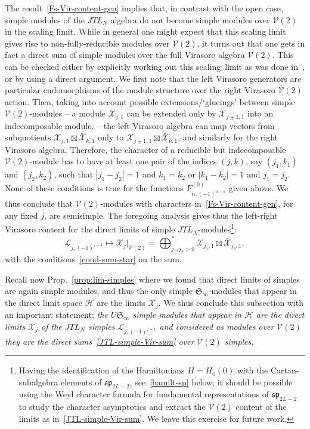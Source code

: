 \documentclass[11pt]{article}
\newcommand{\scal}{scaling~}
\newcommand{\q}{\mathfrak{q}}
\newcommand{\JTL}[1]{JTL_{#1}}
\newcommand{\LQGodd}{U^{\text{odd}}_{\q} s\ell(2)}
\newcommand{\Hilb}{\mathcal{H}}
\newcommand{\Vir}{\mathcal{V}}
\newcommand{\VirN}{\boldsymbol{\mathcal{V}}}
\newcommand{\interLie}{\mathfrak{S}}
\newcommand{\interinfin}{\interLie_{\infty}}
\newcommand{\interM}[1]{\mathscr{X}_{#1}}
\newcommand{\ssp}{\mathfrak{sp}}
\newcommand{\VX}{\mathcal{X}}
\newcommand{\AIrrTL}[2]{\mathscr{L}_{#1,#2}}
\theoremstyle{definition}
\begin{document}
The result~\eqref{Fs-Vir-content-gen} implies that, in contrast with the open
case, simple modules of the $\JTL{N}$ algebra do not become simple
modules over $\VirN(2)$ in the scaling limit. While in general one
might expect that this scaling limit gives rise to non-fully-reducible
modules over $\VirN(2)$, it turns out that one gets in fact a direct
sum of simple modules over the full Virasoro algebra
$\VirN(2)$. This can be checked either by explicitly working out this
\scal limit as  was done in~\cite{GRS1}, or by using a direct
argument. We first note that the left Virasoro generators are
particular endomorphisms of the module structure over the right
Virasoro $\bar{\Vir}(2)$ action. Then, taking into account possible extensions/`glueings' between
 simple $\Vir(2)$-modules -- a module $\VX_{j,1}$ can be extended only
by $\VX_{j\pm1,1}$ into an indecomposable module, -- the left Virasoro
algebra can map vectors from subquotients $\VX_{j,1}\boxtimes\bar{\VX}_{k,1}$
only to $\VX_{j\pm1,1}\boxtimes\bar{\VX}_{k,1}$,  and similarly for the right Virasoro algebra.  Therefore, the
character of a reducible but indecomposable $\VirN(2)$-module has to have at least
one pair of the indices $(j,k)$, say $(j_1,k_1)$ and $(j_2,k_2)$, such that $|j_1-j_2|=1$ and $k_1=k_2$ or $|k_1-k_2|=1$ and $j_1=j_2$. None of these conditions
  is true for the functions $F_{n,(-1)^{n-1}}^{(0)}$ given above. We
thus conclude that $\VirN(2)$-modules with characters
in~\eqref{Fs-Vir-content-gen}, for any fixed $j$, are semisimple. The
foregoing analysis gives thus the left-right Virasoro content for the direct limits of simple
$\JTL{N}$-modules\footnote{
Having the identification of the Hamiltonians $H=H_0(0)$
with the Cartan-subalgebra elements of $\ssp_{2L-2}$, see~\eqref{hamilt-sp} below,  it should be possible using the Weyl character formula for fundamental
  representations of $\ssp_{2L-2}$ to study the character asymptotics and
extract the $\VirN(2)$ content of the limits as in~\eqref{JTL-simple-Vir-sum}. We leave this exercise for  future work.
}:
\begin{equation}\label{JTL-simple-Vir-sum}
\AIrrTL{j}{(-1)^{j+1}} \mapsto \interM{j}|_{\VirN(2)}=\bigoplus_{j_1,j_2> 0}^* \VX_{j_1,1}\boxtimes\bar{\VX}_{j_2,1},
\end{equation}
with the conditions~\eqref{cond-sum-star} on the sum.

Recall now Prop.~\ref{prop:lim-simples} where we found that direct limits of simples are again simple modules,
and thus the only simple $\interinfin$-modules that appear in the direct limit space $\Hilb$ are the limits $\interM{j}$.
 We thus conclude this subsection with an important statement: \textit{the $U\interinfin$ simple modules that appear in $\Hilb$ are the direct limits $\interM{j}$ of the $\JTL{N}$ simples $\AIrrTL{j}{(-1)^{j+1}}$ and considered as modules over $\VirN(2)$ they are the direct sums~\eqref{JTL-simple-Vir-sum} over $\VirN(2)$ simples.}
\end{document}
